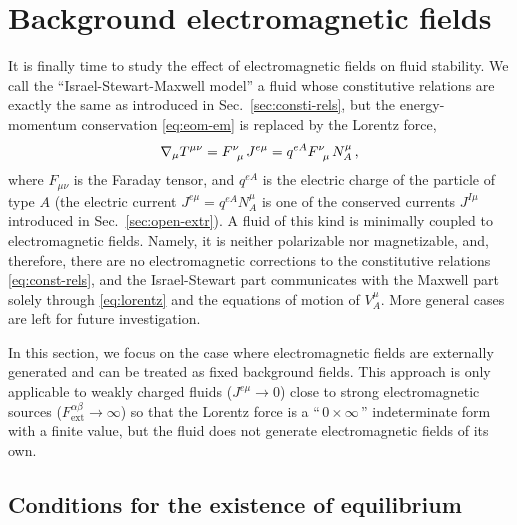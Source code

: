 \documentclass[
a4paper,
amsfonts,
amsmath,
reprint,
showkeys,
nofootinbib,
twoside,
onecolumn,
notitlepage
]{revtex4-1}
\begin{document}
	\section{Background electromagnetic fields}
	\label{sec:bg-fields}
	
	It is finally time to study the effect of electromagnetic fields on fluid stability. 
	We call the ``Israel-Stewart-Maxwell model'' a fluid whose constitutive relations are exactly the same as introduced in Sec.\ \ref{sec:consti-rels}, but the energy-momentum conservation \eqref{eq:eom-em} is replaced by the Lorentz force,
	\begin{equation}\label{eq:lorentz}
		\nabla_\mu T^{\mu \nu} =  F\indices{^\nu _\mu }J^{e\mu}= q^{eA} F\indices{^\nu _\mu }N_A^{\mu} \, ,
	\end{equation}
	where $F_{\mu\nu}$ is the Faraday tensor, and $q^{eA}$ is the electric charge of the particle of type $A$ (the electric current $J^{e\mu}=q^{eA}N_A^\mu$ is one of the conserved currents $J^{I\mu}$ introduced in Sec.\ \ref{sec:open-extr}). 
	A fluid of this kind is minimally coupled to electromagnetic fields.
	Namely, it is neither polarizable nor magnetizable, and, therefore, there are no electromagnetic corrections to the constitutive relations \eqref{eq:const-rels}, and the Israel-Stewart part communicates with the Maxwell part solely through \eqref{eq:lorentz} and the equations of motion of $V_A^\mu$. 
	More general cases are left for future investigation. 
	
	In this section, we focus on the case where electromagnetic fields are externally generated and can be treated as fixed background fields. 
	This approach is only applicable to weakly charged fluids ($J^{e\mu}\rightarrow 0$) close to strong electromagnetic sources ($F^{\alpha \beta}_{\text{ext}}\rightarrow \infty$) so that the Lorentz force is a ``$\, 0 \times \infty \,$'' indeterminate form with a finite value, but the fluid does not generate electromagnetic fields of its own. 
	
	\subsection{Conditions for the existence of equilibrium}
	
\end{document}
